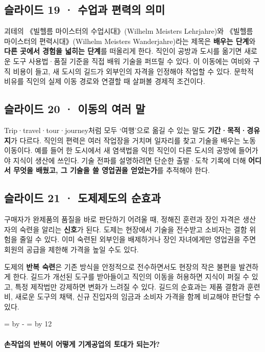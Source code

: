 \documentclass[10pt,a4paper]{article}
\newcommand{\ReserveQuestionSpace}{%
  \par\begingroup
  \dimen0=\pagegoal \advance\dimen0 by -\pagetotal
  \dimen2=\baselineskip \multiply\dimen2 by 12
  \ifdim\dimen0<\dimen2 \newpage\fi
  \endgroup}
\begin{document}
\subsection{슬라이드 19 · 수업과 편력의 의미}
괴테의 《빌헬름 마이스터의 수업시대》(Wilhelm Meisters Lehrjahre)와 《빌헬름 마이스터의 편력시대》(Wilhelm Meisters Wanderjahre)라는 제목은 \textbf{배우는 단계}와 \textbf{다른 곳에서 경험을 넓히는 단계}를 떠올리게 한다. 직인이 공방과 도시를 옮기면 새로운 도구 사용법·품질 기준을 직접 배워 기술을 퍼뜨릴 수 있다. 이 이동에는 여비와 구직 비용이 들고, 새 도시의 길드가 외부인의 자격을 인정해야 작업할 수 있다. 문학적 비유를 직인의 실제 이동 경로와 연결할 때 살펴볼 경제적 조건이다.\par

\subsection{슬라이드 20 · 이동의 여러 말}
Trip·travel·tour·journey처럼 모두 ‘여행’으로 옮길 수 있는 말도 \textbf{기간·목적·경유지}가 다르다. 직인의 편력은 여러 작업장을 거치며 일자리를 찾고 기술을 배우는 노동 이동이다. 예를 들어 한 도시에서 새 염색법을 익힌 직인이 다른 도시의 공방에 들어가야 지식이 생산에 쓰인다. 기술 전파를 설명하려면 단순한 출발·도착 기록에 더해 \textbf{어디서 무엇을 배웠고, 그 기술을 쓸 영업권을 얻었는가}를 추적해야 한다.\par

\subsection{슬라이드 21 · 도제제도의 순효과}
구매자가 완제품의 품질을 바로 판단하기 어려울 때, 정해진 훈련과 장인 자격은 생산자의 숙련을 알리는 \textbf{신호}가 된다. 도제는 현장에서 기술을 전수받고 소비자는 결함 위험을 줄일 수 있다. 이미 숙련된 외부인을 배제하거나 장인 자녀에게만 영업권을 주면 회원의 공급을 제한해 가격을 높일 수도 있다.\par

도제의 \textbf{반복 숙련}은 기존 방식을 안정적으로 전수하면서도 현장의 작은 불편을 발견하게 한다. 길드가 개선된 도구를 받아들이고 직인의 이동을 허용하면 지식이 퍼질 수 있고, 특정 제작법만 강제하면 변화가 느려질 수 있다. 길드의 순효과는 제품 결함과 훈련비, 새로운 도구의 채택, 신규 진입자의 임금과 소비자 가격을 함께 비교해야 판단할 수 있다.\par

\ReserveQuestionSpace
\paragraph{손작업의 반복이 어떻게 기계공업의 토대가 되는가?}
\end{document}
